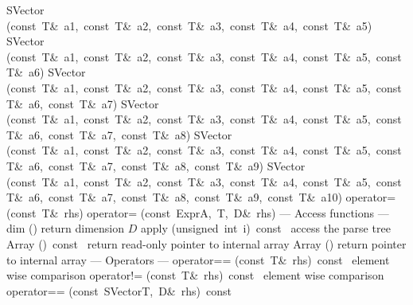 \documentclass{article}
\begin{document}
\begin{cxxentry}
\begin{cxxclass}
\begin{cxxpublic}
\label{cxx.1.1.13}
\cxxitem{}
        {SVector}
        {(const\ T\&\ a1,\ const\ T\&\ a2,\ const\ T\&\ a3,\ const\ T\&\ a4,\ const\ T\&\ a5)}
        {}
        {}
\label{cxx.1.1.14}
\cxxitem{}
        {SVector}
        {(const\ T\&\ a1,\ const\ T\&\ a2,\ const\ T\&\ a3,\ const\ T\&\ a4,\ const\ T\&\ a5,\ const\ T\&\ a6)}
        {}
        {}
\label{cxx.1.1.15}
\cxxitem{}
        {SVector}
        {(const\ T\&\ a1,\ const\ T\&\ a2,\ const\ T\&\ a3,\ const\ T\&\ a4,\ const\ T\&\ a5,\ const\ T\&\ a6,\ const\ T\&\ a7)}
        {}
        {}
\label{cxx.1.1.16}
\cxxitem{}
        {SVector}
        {(const\ T\&\ a1,\ const\ T\&\ a2,\ const\ T\&\ a3,\ const\ T\&\ a4,\ const\ T\&\ a5,\ const\ T\&\ a6,\ const\ T\&\ a7,\ const\ T\&\ a8)}
        {}
        {}
\label{cxx.1.1.17}
\cxxitem{}
        {SVector}
        {(const\ T\&\ a1,\ const\ T\&\ a2,\ const\ T\&\ a3,\ const\ T\&\ a4,\ const\ T\&\ a5,\ const\ T\&\ a6,\ const\ T\&\ a7,\ const\ T\&\ a8,\ const\ T\&\ a9)}
        {}
        {}
\label{cxx.1.1.18}
\cxxitem{}
        {SVector}
        {(const\ T\&\ a1,\ const\ T\&\ a2,\ const\ T\&\ a3,\ const\ T\&\ a4,\ const\ T\&\ a5,\ const\ T\&\ a6,\ const\ T\&\ a7,\ const\ T\&\ a8,\ const\ T\&\ a9,\ const\ T\&\ a10)}
        {}
        {}
\label{cxx.1.1.19}
        {operator=}
        {(const\ T\&\ rhs)}
        {}
        {}
\label{cxx.1.1.20}
        {operator=}
        {(const\ Expr\<A,\ T,\ D\>\&\ rhs)}
        {}
        {}
\label{cxx.1.1.21}
\cxxitem{}
        {--- Access functions --- }
        {}
        {}
        {}
\label{cxx.1.1.22}
        {dim}
        {()}
        { return dimension $D$}
        {}
\label{cxx.1.1.23}
        {apply}
        {(unsigned\ int\ i)\ const\ }
        { access the parse tree}
        {}
\label{cxx.1.1.24}
        {Array}
        {()\ const\ }
        { return read-only pointer to internal array}
        {}
\label{cxx.1.1.25}
        {Array}
        {()}
        { return pointer to internal array}
        {}
\label{cxx.1.1.26}
\cxxitem{}
        {--- Operators --- }
        {}
        {}
        {}
\label{cxx.1.1.27}
        {operator==}
        {(const\ T\&\ rhs)\ const\ }
        { element wise comparison}
        {}
\label{cxx.1.1.28}
        {operator!=}
        {(const\ T\&\ rhs)\ const\ }
        { element wise comparison}
        {}
\label{cxx.1.1.29}
        {operator==}
        {(const\ SVector\<T,\ D\>\&\ rhs)\ const\ }

\end{cxxpublic}
\end{cxxclass}
\end{cxxentry}
\end{document}
